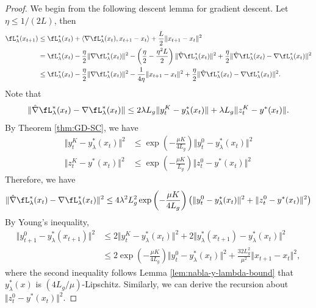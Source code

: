 \begin{proof}
We begin from the following descent lemma for gradient descent. Let $\eta \le 1/(2L)$, then
\begin{align} \label{eq:des}
\begin{split}
    \fL_{\lambda}^*(x_{t+1}) &\le \fL_{\lambda}^*(x_t) + \langle \nabla \fL_{\lambda}^*(x_t) , x_{t+1} - x_t
    \rangle + \frac{L}{2} \Vert x_{t+1 } - x_t \Vert^2 \\
    &= \fL_{\lambda}^*(x_t) -
    \frac{\eta}{2} \Vert \nabla \fL_{\lambda}^*(x_t) \Vert^2 -
    \left( \frac{\eta}{2} - \frac{\eta^2 L}{2} \right) \Vert \hat \nabla \fL_{\lambda}^*(x_t) \Vert^2 + \frac{\eta}{2} \Vert \hat  \nabla \fL_{\lambda}^*(x_t) - \nabla \fL_{\lambda}^*(x_t) \Vert^2 \\
    &\le \fL_{\lambda}^*(x_t) 
    - \frac{\eta}{2} \Vert \nabla \fL_{\lambda}^*(x_t) \Vert^2 - 
    \frac{1}{4\eta} \Vert x_{t+1} - x_{t} \Vert^2
    + \frac{\eta}{2} \Vert  \hat \nabla \fL_{\lambda}^*(x_t) - \nabla \fL_{\lambda}^*(x_t) \Vert^2.
\end{split}
\end{align}
Note that
\begin{align*}
    \Vert \hat \nabla \fL_{\lambda}^*(x_t) - \nabla \fL_{\lambda}^*(x_t) \Vert \le 2 \lambda L_g \Vert y_{t}^K- y_{\lambda}^*(x_t) \Vert + \lambda L_g \Vert z_{t}^K - y^*(x_t) \Vert.
\end{align*}
By Theorem \ref{thm:GD-SC}, we have
\begin{align*}
    \Vert y_t^K - y_{\lambda}^*(x_t) \Vert^2 &\le \exp\left( - \frac{\mu K}{4 L_g} \right) \Vert y_t^0 - y_{\lambda}^*(x_t) \Vert^2 \\
     \Vert z_t^K - y^*(x_t) \Vert^2 &\le \exp\left( - \frac{\mu K}{L_g} \right) \Vert z_t^0 - y^*(x_t) \Vert^2
\end{align*}
Therefore, we have
\begin{align} \label{eq:err}
    \Vert \hat \nabla \fL_{\lambda}^*(x_t)- \nabla \fL_{\lambda}^*(x_t) \Vert^2 \le 4 \lambda^2 L_g^2 \exp\left( - \frac{\mu K}{4 L_g} \right) \left( \Vert y_t^0 - y_{\lambda}^*(x_t) \Vert^2 + \Vert z_t^0 - y^*(x_t) \Vert^2 \right)
\end{align}
By Young's inequality, 
\begin{align*}
    \Vert y_{t+1}^0 - y_{\lambda}^*(x_{t+1}) \Vert^2 & \le 2 \Vert y_t^K - y_{\lambda}^*(x_{t}) \Vert^2 + 2 \Vert y_{\lambda}^*(x_{t+1}) - y_{\lambda}^*(x_t) \Vert^2  \\
    &\le 2 \exp \left( - \frac{\mu K}{4 L_g} \right) \Vert y_t^0 - y_{\lambda}^*(x_t) \Vert^2 + \frac{32 L_g^2}{\mu^2} \Vert x_{t+1} - x_t \Vert^2,
\end{align*}
where the second inequality follows Lemma \ref{lem:nabla-y-lambda-bound} that $y_{\lambda}^*(x)$ is $(4 L_g/\mu)$-Lipschitz.  Similarly, we can derive the recursion about $\Vert z_t^0 - y^*(x_t) \Vert^2$. 


\end{proof}
